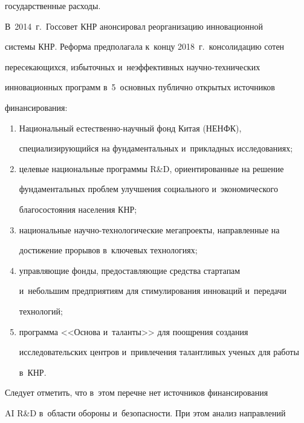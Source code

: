 государственные расходы.


     


     В~2014~г.\ Госсовет КНР анонсировал реорганизацию инновационной 


системы КНР. Реформа предполагала к~концу 2018~г.\ консолидацию сотен 


пересекающихся, избыточных и~неэффективных на\-уч\-но-тех\-ни\-че\-ских 


инновационных программ в~5~основных публично открытых источников 


финансирования:


     \begin{enumerate}[(1)]


\item Национальный естественно-научный фонд Китая (НЕНФК), 


специализирующийся на фундаментальных и~прикладных исследованиях;


\item целевые национальные программы R\&D, ориентированные на решение 


фундаментальных проблем улучшения социального и~экономического 


бла\-го\-со\-сто\-яния населения КНР;


\item национальные научно-технологические мегапроекты, направленные на 


достижение прорывов в~ключевых технологиях;


\item управляющие фонды, предостав\-ля\-ющие средства стартапам 


и~небольшим предприятиям для стимулирования инноваций и~передачи 


технологий;


    \item программа <<Основа и~таланты>> для поощрения создания 


исследовательских цент\-ров и~привлечения талантливых ученых для работы 


в~КНР.


\end{enumerate}





     Следует отметить, что в~этом перечне нет источников финансирования 


AI R\&D в~области обороны и~безопасности. При этом анализ направлений 


